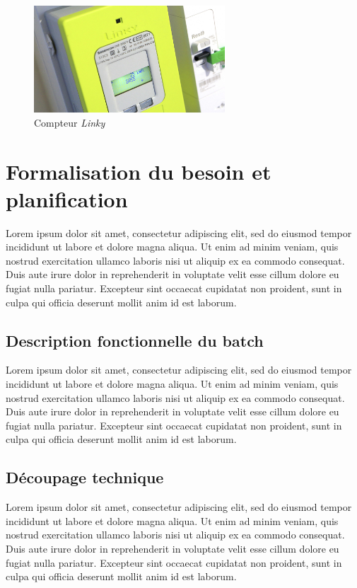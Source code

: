 \documentclass[a4paper, 12pt]{report}
\begin{document}
\begin{figure}[b]
  \begin{center}
    \includegraphics[height=4cm]{../res/linky.jpg}
    \caption{Compteur \textit{Linky}}
  \end{center}
\end{figure}

\section{Formalisation du besoin et planification}

Lorem ipsum dolor sit amet, consectetur adipiscing elit, sed do eiusmod tempor incididunt ut labore et dolore magna aliqua. Ut enim ad minim veniam, quis nostrud exercitation ullamco laboris nisi ut aliquip ex ea commodo consequat. Duis aute irure dolor in reprehenderit in voluptate velit esse cillum dolore eu fugiat nulla pariatur. Excepteur sint occaecat cupidatat non proident, sunt in culpa qui officia deserunt mollit anim id est laborum.

\subsection{Description fonctionnelle du batch}

Lorem ipsum dolor sit amet, consectetur adipiscing elit, sed do eiusmod tempor incididunt ut labore et dolore magna aliqua. Ut enim ad minim veniam, quis nostrud exercitation ullamco laboris nisi ut aliquip ex ea commodo consequat. Duis aute irure dolor in reprehenderit in voluptate velit esse cillum dolore eu fugiat nulla pariatur. Excepteur sint occaecat cupidatat non proident, sunt in culpa qui officia deserunt mollit anim id est laborum.

\subsection{Découpage technique}

Lorem ipsum dolor sit amet, consectetur adipiscing elit, sed do eiusmod tempor incididunt ut labore et dolore magna aliqua. Ut enim ad minim veniam, quis nostrud exercitation ullamco laboris nisi ut aliquip ex ea commodo consequat. Duis aute irure dolor in reprehenderit in voluptate velit esse cillum dolore eu fugiat nulla pariatur. Excepteur sint occaecat cupidatat non proident, sunt in culpa qui officia deserunt mollit anim id est laborum.
\end{document}
